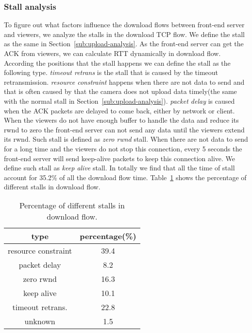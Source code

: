 \subsubsection{Stall analysis}
\label{sub:stall-download}

To figure out what factors influence the download flows between front-end server and viewers, we analyze the stalls in the download TCP flow. We define the stall as the same in Section~\ref{sub:upload-analysis}. As the front-end server can get the ACK from viewers, we can calculate RTT dynamically in download flow. 
According the positions that the stall happens we can define the stall as the following type. \emph{timeout retrans} is the stall that is caused by the timeout retransmission. \emph{resource constraint} happens when there are not data to send and that is often caused by that the camera does not upload data timely(the same with the normal stall in Section~\ref{sub:upload-analysis}). \emph{packet delay} is caused when the ACK packets are delayed to come back, either by network or client. When the viewers do not have enough buffer to handle the data and reduce its rwnd to zero the front-end server can not send any data until the viewers extend its rwnd. Such stall is defined as \emph{zero rwnd} stall. When there are not data to send for a long time and the viewers do not stop this connection, every 5 seconds the front-end server will send keep-alive packets to keep this connection alive. We define such stall as \emph{keep alive} stall. In totally we find that all the time of stall account for 35.2\% of all the download flow time.  Table~\ref{tbl:stall-download} shows the percentage of different stalls in download flow.

\begin{table}[ht]
\tablefontsize
\renewcommand{\arraystretch}{\assize}
 \setlength{\tabcolsep}{3pt}
\caption{Percentage of different stalls in download flow.}
\centering
\begin{tabular}{c|c}
	\toprule
	 type & percentage(\%)\\
	\hline
	resource constraint & 39.4   \\
	\hline
	packet delay & 8.2 \\
	\hline
	zero rwnd & 16.3 \\
	\hline
	keep alive & 10.1 \\
	\hline
	timeout retrans. & 22.8 \\
	\hline
	unknown & 1.5 \\
	\bottomrule
\end{tabular}
\label{tbl:stall-download}
\termspace
\end{table}  

